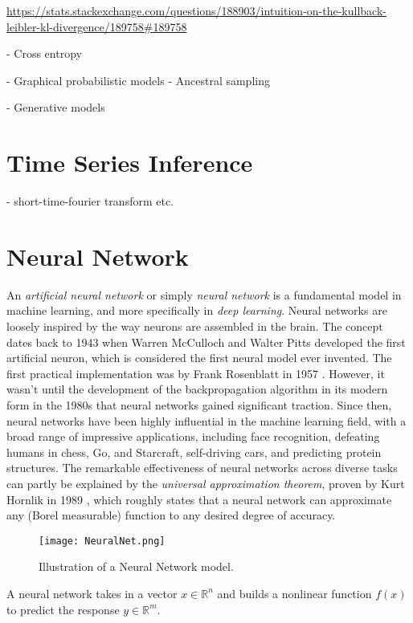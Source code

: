 \documentclass[../../thesis.tex]{subfiles}
\begin{document}
\url{https://stats.stackexchange.com/questions/188903/intuition-on-the-kullback-leibler-kl-divergence/189758#189758}

- Cross entropy 

- Graphical probabilistic models 
    - Ancestral sampling

- Generative models


\section{Time Series Inference}
- short-time-fourier transform etc.

\section{Neural Network}
An \textit{artificial neural network} or simply \textit{neural network} is a fundamental model in machine learning, and more specifically in \textit{deep learning}. Neural networks are loosely inspired by the way neurons are assembled in the brain. The concept dates back to 1943 when Warren McCulloch and Walter Pitts developed the first artificial neuron, which is considered the first neural model ever invented\cite{MCCULLOCH199099}. The first practical implementation was by Frank Rosenblatt in 1957 \cite{rosenblatt1957perceptron}. However, it wasn't until the development of the backpropagation algorithm in its modern form in the 1980s that neural networks gained significant traction. Since then, neural networks have been highly influential in the machine learning field, with a broad range of impressive applications, including face recognition, defeating humans in chess, Go, and Starcraft, self-driving cars, and predicting protein structures.
The remarkable effectiveness of neural networks across diverse tasks can partly be explained by the \textit{universal approximation theorem}, proven by Kurt Hornlik in 1989 \cite{HORNIK1989359}, which roughly states that a neural network can approximate any (Borel measurable) function to any desired degree of accuracy. 

\begin{figure}
    \texttt{[image: NeuralNet.png]}
    \centering 
    \caption{Illustration of a Neural Network model.}
    \label{fig:NeuralNet}
\end{figure}

A neural network takes in a vector $x \in \mathbb{R}^n$ and builds a nonlinear function $f(x)$ to predict the response $y\in \mathbb{R}^m$. 
\end{document}

